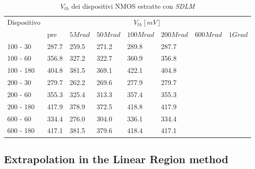 \documentclass[12pt, letterpaper]{book}
\begin{document}
\begin{table}[H]
  \renewcommand{\arraystretch}{1.3}
    \begin{tabular}{m{2cm} m{0.8cm} m{1.1cm} m{1.3cm} m{1.5cm} m{1.5cm} m{1.5cm} m{1cm}}
      \toprule
      \multirow{2}{*}{Dispositivo} & \multicolumn{7}{c}{$V_{th} [mV] $}                                                                    \\
      \cmidrule{2-8}
                                   & pre                               & $5Mrad$ & $50Mrad$ & $100Mrad$ & $200Mrad$ & $600Mrad$ & $1Grad$ \\
      \midrule
      100 - 30                 	& 287.7                        	&259.5		& 271.2    	& 289.8 		& 287.7     	&      	&    \\
      \hline
      100 - 60                  	& 356.8                       	& 327.2    	& 322.7     	& 360.9  	& 356.8     	&      	&    \\
      \hline
      100 - 180               	& 404.8                        	& 381.5		& 369.1    	& 422.1     	& 404.8     	&      	&    \\
      \hline
      200 - 30 			& 279.7                         	& 262.2  	& 269.6    	& 277.9     	& 279.7     	&     	&    \\
      \hline
      200 - 60                  	& 355.3					& 325.4  	& 313.3   	& 357.4     	& 355.3   	&      	&    \\
      \hline
      200 - 180                 	& 417.9                        	& 378.9   	& 372.5    	& 418.8     	& 417.9    	&      	&    \\
      \hline
      600 - 60              	& 334.4                           & 276.0   	& 304.0    	& 336.1      	& 334.4    	&      	&    \\
      \hline
      600 - 180                	& 417.1                           & 381.5   	& 379.6   	& 418.4     	& 417.1     	&      	&    \\
      \bottomrule
    \end{tabular}
  \caption{$V_{th}$ dei dispositivi NMOS estratte con \emph{SDLM}}
  \label{tab:VthSDLMN}
\end{table}











\subsection{Extrapolation in the Linear Region method}
\end{document}
